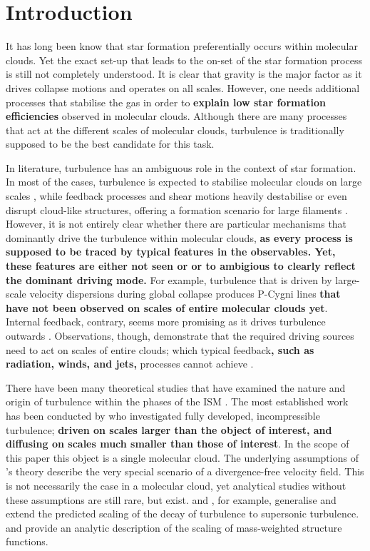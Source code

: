 \section{Introduction}\label{intro}

It has long been know that star formation preferentially occurs within molecular clouds. 
Yet the exact set-up that leads to the on-set of the star formation process is still not completely understood.
It is clear that gravity is the major factor as it drives collapse motions and operates on all scales.
However, one needs additional processes that stabilise the gas in order to \textbf{explain low star formation efficiencies} observed in molecular clouds. 
Although there are many processes that act at the different scales of molecular clouds, turbulence is traditionally supposed to be the best candidate for this task.

In literature, turbulence has an ambiguous role in the context of star formation. 
In most of the cases, turbulence is expected to stabilise molecular clouds on large scales \citep{Fleck1980,McKee1992,MacLow2003}, while feedback processes and shear motions heavily destabilise or even disrupt cloud-like structures, offering a formation scenario for large filaments \citep{Tan2013,Miyamoto2014}. 
However, it is not entirely clear whether there are particular mechanisms that dominantly drive the turbulence within molecular clouds, \textbf{as every process is supposed to be traced by typical features in the observables.
Yet, these features are either not seen or or to ambigious to clearly reflect the dominant driving mode.}
For example, turbulence that is driven by large-scale velocity dispersions during global collapse \citep{Ballesteros2011a,Ballesteros2011b,Hartmann2012} produces P-Cygni lines \textbf{ that have not been observed on scales of entire molecular clouds yet}. 
Internal feedback, contrary, seems more promising as it drives turbulence outwards \citep{Dekel2013,Krumholz2014}.
Observations, though, demonstrate that the required driving sources need to act on scales of entire clouds; which typical feedback\textbf{, such as radiation, winds, and jets,} processes cannot achieve \citep{Brunt2009,Brunt2013,Heyer2004}.

There have been many theoretical studies that have examined the nature and origin of turbulence within the phases of the ISM \citep[and references within]{MacLow2004}. 
The most established work has been conducted by \citet{Kolmogorov1941} who investigated fully developed, incompressible turbulence; \textbf{driven on scales larger than the object of interest, and diffusing on scales much smaller than those of interest}.
In the scope of this paper this object is a single molecular cloud. 
The underlying assumptions of \citeauthor{Kolmogorov1941}'s theory describe the very special scenario of a divergence-free velocity field. 
This is not necessarily the case in a molecular cloud, yet analytical studies without these assumptions are still rare, but exist. 
\citet{She1994} and \citet{Boldyrev2002}, for example, generalise and extend the predicted scaling of the decay of turbulence to supersonic turbulence.
\citet{Galtier2011} and \citet{Banerjee2013} provide an analytic description of the scaling of mass-weighted structure functions.

